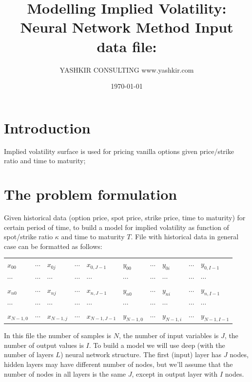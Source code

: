 \documentclass[10pt]{article}
\title{Modelling Implied Volatility: Neural Network Method }
\author{YASHKIR CONSULTING \quad www.yashkir.com}
\date{\today}
\begin{document}
\maketitle
\tableofcontents	

\section{Introduction}

Implied volatility surface \citep{hjm} is used for pricing vanilla options given price/strike ratio and time to maturity;

\section{The problem formulation}\label{hjm}
Given historical data (option price, spot price, strike price, time to maturity) for certain period of time, to build a model for implied volatility as function of spot/strike ratio $\kappa$ and time to maturity $T$. File with historical data in general case can be formatted as follows:
\begin{table}[H] 
\title{Input data file: \\} 
\label{indata}
\begin{tabular}{ |llllllllll|}
\hline
$x_{00}$ & $\cdots$  & $x_{0j}$ & $\cdots$  & $x_{0,J-1}$ & $y_{00} $ & $\cdots$ & $y_{0i}$ & $\cdots$ &$y_{0,I-1}$ \\
$\cdots$ & $\cdots$ & $\cdots$ & $\cdots$& $\cdots$& $\cdots$& $\cdots$& $\cdots$& $\cdots$& $\cdots$ \\
$x_{n0}$ & $\cdots$  & $x_{nj}$ & $\cdots$ & $x_{n,J-1}$ & $y_{n0} $ & $\cdots$ & $y_{ni}$ & $\cdots$ &$y_{n,I-1} $ \\
$\cdots$ & $\cdots$ & $\cdots$ & $\cdots$& $\cdots$& $\cdots$& $\cdots$& $\cdots$& $\cdots$& $\cdots$ \\
$x_{N-1,0}$ & $\cdots$  & $x_{N-1,j}$ & $\cdots$ & $x_{N-1,J-1}$ & $y_{N-1,0} $ & $\cdots$ & $y_{N-1,i}$ & $\cdots$ &$y_{N-1,I-1}  $ \\
\hline
\end{tabular}
\end{table}

In this file the number of samples is $N$, the number of input variables is $J$, the number of output values is  $I$.
To build a model we will use deep (with the number of layers $L$) neural network structure. The first (input) layer has $J$ nodes, hidden layers may have different number of nodes, but we'll assume that the number of nodes in all layers is the same $J$, except in output layer with $I$ nodes.
 
\end{document}
